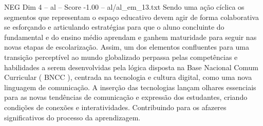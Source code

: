 \begin{textsample}{NEG Dim 4 – al – Score -1.00 – al/al\_em\_13.txt}
Sendo uma ação cíclica os segmentos que representam o espaço educativo devem agir de forma colaborativa se esforçando e articulando estratégias para que o aluno concluinte do fundamental e do ensino médio aprendam e ganhem maturidade para seguir nas novas etapas de escolarização.
Assim, um dos elementos confluentes para uma transição perceptível ao mundo globalizado perpassa pelas competências e habilidades a serem desenvolvidas pela lógica disposta na Base Nacional Comum Curricular ( BNCC ), centrada na tecnologia e cultura digital, como uma nova linguagem de comunicação.
A inserção das tecnologias lançam olhares essenciais para as novas tendências de comunicação e expressão dos estudantes, criando condições de conexões e interatividades.
Contribuindo para os afazeres significativos do processo da aprendizagem.

\end{textsample}
